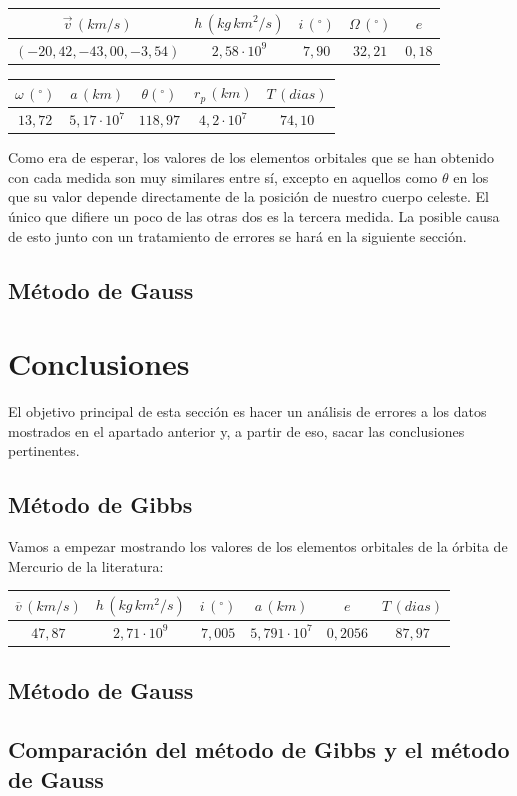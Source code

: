 \documentclass{article}
\numberwithin{equation}{section}
\begin{document}
\begin{center}
    \centering
    \begin{tabular}{|c|c|c|c|c|}
    \hline
    $\overrightarrow{v}\, (km/s)$ & $h\, (kg\, km^{2}/s)$ & $i\, (^{\circ})$ & $\Omega\, (^\circ)$ & $e$ \\ \hline
    $(-20,42, -43,00, -3,54)$ & $2,58 \cdot 10^{9}$ & $7,90$ & $32,21$ & $0,18$  \\ \hline
    \end{tabular}
\end{center}

\begin{center}
    \centering
    \begin{tabular}{|c|c|c|c|c|}
    \hline
    $\omega\, (^\circ)$ & $a\, (km)$ & $\theta (^\circ)$ & $r_{p}\, (km)$ & $T\, (dias)$\\ \hline
    $13,72$ & $5,17\cdot 10^{7}$ & $118,97$ & $4,2\cdot 10^{7}$ & $74,10$ \\ \hline
    \end{tabular}
\end{center} 
Como era de esperar, los valores de los elementos orbitales 
que se han obtenido con cada medida son muy similares entre sí, excepto 
en aquellos como $\theta$ en los que su valor depende directamente de 
la posición de nuestro cuerpo celeste. 
El único que difiere un poco de las otras dos es la tercera medida. 
La posible causa de esto junto con un tratamiento de errores 
se hará en la siguiente sección. 
\subsection{Método de Gauss}
\section{Conclusiones} %
El objetivo principal de esta sección es hacer un análisis 
de errores a los datos mostrados en el apartado anterior y, 
a partir de eso, sacar las conclusiones pertinentes. 
\subsection{Método de Gibbs}
Vamos a empezar mostrando los valores de los elementos orbitales 
de la órbita de Mercurio de la literatura: 
\begin{center}
    \centering
    \begin{tabular}{|c|c|c|c|c|c|}
    \hline
    $\overline{v}\, (km/s)$ & $h\, (kg\, km^{2}/s)$ & $i\, (^{\circ})$ & $a\, (km)$ & $e$ & $T\, (dias)$ \\ \hline
    $47,87$ & $2,71 \cdot 10^{9}$ & $7,005$ & $5,791\cdot 10^{7}$ & $0,2056$ & $87,97$ \\ \hline
    \end{tabular}
\end{center}

\subsection{Método de Gauss}
\subsection{Comparación del método de Gibbs y el método de 
Gauss}
\end{document}
